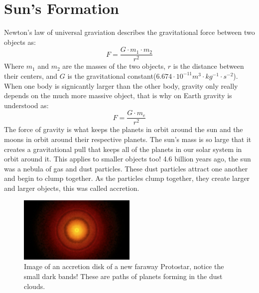 \documentclass[12pt,oneside,a4paper,english]{article}
\begin{document}
\section{Sun's Formation}
Newton's law of universal graviation describes the gravitational force between two objects as:
\begin{equation}
    F = \frac{G \cdot m_1 \cdot m_2}{r^2}
\end{equation}
Where $m_1$ and $m_2$ are the masses of the two objects, $r$ is the distance between their centers, and $G$ is the gravitational constant($6.674\cdot 10^{-11} m^3 \cdot kg^{-1} \cdot s^{-2}$). When one body is signicantly larger than the other body, gravity only really depends on the much more massive object, that is why on Earth gravity is understood as:
\begin{equation}
    F = \frac{G \cdot m_e}{r^2}
\end{equation}
The force of gravity is what keeps the planets in orbit around the sun and the moons in orbit around their respective planets. The sun's mass is so large that it creates a gravitational pull that keeps all of the planets in our solar system in orbit around it. This applies to smaller objects too! 4.6 billion years ago, the sun was a nebula of gas and dust particles. These dust particles attract one another and begin to clump together. As the particles clump together, they create larger and larger objects, this was called accretion. 
\begin{figure}[H]
    \centering
    \includegraphics[width=0.5\textwidth]{SolarSys1.jpg}
    \caption{Image of an accretion disk of a new faraway Protostar, notice the small dark bands! These are paths of planets forming in the dust clouds.\cite{solarsysImg}}
    \label{fig:solardisk}
\end{figure}
\end{document}
